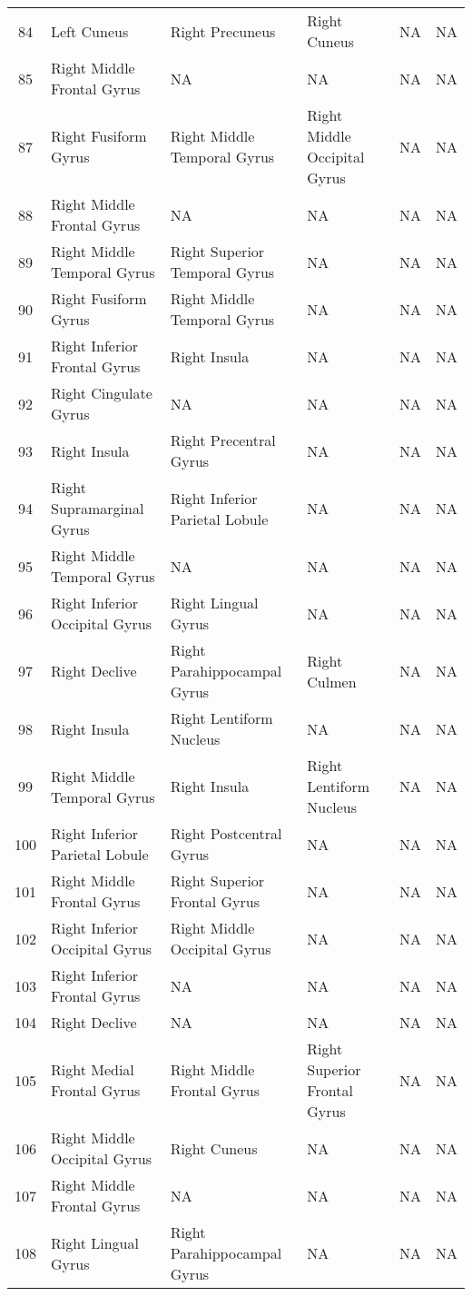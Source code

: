 \documentclass[10pt,letterpaper]{article}\usepackage[]{graphicx}\usepackage[]{color}
\begin{document}
\begin{center}
\begin{longtable}[c]{cP{1.1in}P{1.1in}P{1.1in}P{1.1in}P{1.1in}}
		84 & Left Cuneus & Right Precuneus & Right Cuneus & NA & NA \\
		85 & Right Middle Frontal Gyrus	& NA & NA & NA & NA \\
		87 & Right Fusiform Gyrus & Right Middle Temporal Gyrus	& Right Middle Occipital Gyrus & NA	& NA \\
		88 & Right Middle Frontal Gyrus	& NA & NA & NA & NA \\
		89 & Right Middle Temporal Gyrus & Right Superior Temporal Gyrus & NA & NA & NA \\
		90 & Right Fusiform Gyrus & Right Middle Temporal Gyrus	& NA & NA & NA \\
		91 & Right Inferior Frontal Gyrus & Right Insula & NA & NA & NA \\
		92 & Right Cingulate Gyrus & NA	& NA & NA & NA \\
		93 & Right Insula & Right Precentral Gyrus & NA	& NA & NA \\
		94 & Right Supramarginal Gyrus & Right Inferior Parietal Lobule	& NA & NA & NA \\
		95 & Right Middle Temporal Gyrus & NA & NA & NA & NA \\
		96 & Right Inferior Occipital Gyrus & Right Lingual Gyrus & NA & NA	& NA \\
		97 & Right Declive & Right Parahippocampal Gyrus & Right Culmen	& NA & NA \\
		98 & Right Insula & Right Lentiform Nucleus	& NA & NA & NA \\
		99 & Right Middle Temporal Gyrus & Right Insula	& Right Lentiform Nucleus & NA & NA \\
		100	& Right Inferior Parietal Lobule & Right Postcentral Gyrus & NA	& NA & NA \\
		101	& Right Middle Frontal Gyrus & Right Superior Frontal Gyrus	& NA & NA & NA \\
		102	& Right Inferior Occipital Gyrus & Right Middle Occipital Gyrus	& NA & NA & NA \\
		103	& Right Inferior Frontal Gyrus & NA	& NA & NA & NA \\
		104	& Right Declive & NA & NA & NA & NA \\
		105	& Right Medial Frontal Gyrus & Right Middle Frontal Gyrus & Right Superior Frontal Gyrus & NA & NA \\
		106	& Right Middle Occipital Gyrus & Right Cuneus & NA & NA	& NA \\
		107	& Right Middle Frontal Gyrus & NA & NA & NA	& NA \\
		108	& Right Lingual Gyrus & Right Parahippocampal Gyrus	& NA & NA & NA \\

\end{longtable}
\end{center}
\end{document}
